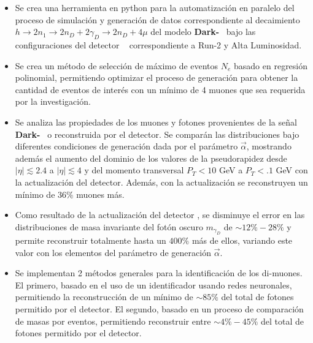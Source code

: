 \begin{itemize}
\item Se crea una herramienta en \textsf{python} para la automatización en paralelo del proceso de simulación y generación de datos correspondiente al decaimiento $h \rightarrow 2n_1 \rightarrow 2n_D + 2\gamma_D \rightarrow 2n_D + 4\mu$ del modelo \textbf{Dark-}\SUSY ~ bajo las configuraciones del detector \CMS ~ correspondiente a Run-2 y Alta Luminosidad.
\item Se crea un método de selección de máximo de eventos $N_e$ basado en regresión polinomial, permitiendo optimizar el proceso de generación para obtener la cantidad de eventos de interés con un mínimo de 4 muones que sea requerida por la investigación. 
\item Se analiza las propiedades de los muones y fotones provenientes de la señal \textbf{Dark-}\SUSY ~ o reconstruida por el detector. Se comparán las distribuciones bajo diferentes condiciones de generación dada por el parámetro $\vec{\alpha}$, mostrando además el aumento del dominio de los valores de la pseudorapidez desde $|\eta|\lesssim 2.4$ a $|\eta|\lesssim 4$ y del momento transversal $P_T<10$ GeV a $P_T<.1$ GeV con la actualización del detector. Además, con la actualización se 
reconstruyen un mínimo de $36\%$ muones más. 
\item Como resultado de la actualización del detector \CMS, se disminuye el error en las distribuciones de masa invariante del fotón oscuro $m_{\gamma_D}$ de $\sim 12\% - 28\%$ y permite reconstruir totalmente hasta un $400\%$ más de ellos, variando este valor con los elementos del parámetro de generación $\vec{\alpha}$.

\item Se implementan 2 métodos generales para la identificación de los di-muones. El primero, basado en el uso de un identificador usando redes neuronales, permitiendo la reconstrucción de un mínimo de $\sim 85\%$ del total de fotones permitido por el detector. El segundo, basado en un proceso de comparación de masas por eventos, permitiendo reconstruir entre $\sim 4\%-45\%$ del total de fotones permitido por el detector. 
\end{itemize}